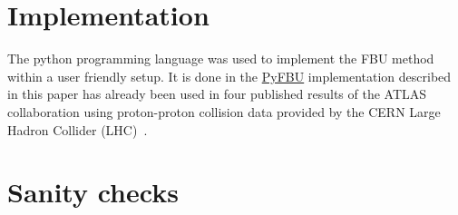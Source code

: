 \documentclass[a4paper]{article}
\begin{document}
\section{Implementation}
The python programming language was used to implement the FBU method within a user friendly setup. It is done in the \href{https://pypi.python.org/pypi/fbu}{PyFBU} implementation described in this paper has already been used in four published results of the ATLAS collaboration using proton-proton collision data provided by the CERN Large Hadron Collider (LHC)~\cite{Aad:2015noh,Aad:2015lgx,Aad:2016ove,Aaboud:2016bit}.

\section{Sanity checks}



\end{document}
